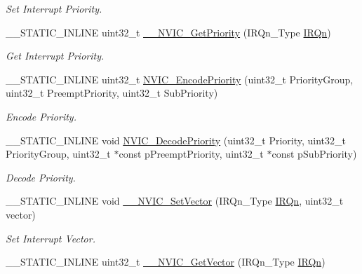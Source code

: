 \begin{DoxyCompactItemize}
\begin{DoxyCompactList}\small\item\em Set Interrupt Priority. \end{DoxyCompactList}\item 
\+\_\+\+\_\+\+S\+T\+A\+T\+I\+C\+\_\+\+I\+N\+L\+I\+NE uint32\+\_\+t \mbox{\hyperlink{group___c_m_s_i_s___core___n_v_i_c_functions_gaeb9dc99c8e7700668813144261b0bc73}{\+\_\+\+\_\+\+N\+V\+I\+C\+\_\+\+Get\+Priority}} (I\+R\+Qn\+\_\+\+Type \mbox{\hyperlink{group___interrupt__vector__numbers_ga666eb0caeb12ec0e281415592ae89083}{I\+R\+Qn}})
\begin{DoxyCompactList}\small\item\em Get Interrupt Priority. \end{DoxyCompactList}\item 
\+\_\+\+\_\+\+S\+T\+A\+T\+I\+C\+\_\+\+I\+N\+L\+I\+NE uint32\+\_\+t \mbox{\hyperlink{group___c_m_s_i_s___core___n_v_i_c_functions_gadb94ac5d892b376e4f3555ae0418ebac}{N\+V\+I\+C\+\_\+\+Encode\+Priority}} (uint32\+\_\+t Priority\+Group, uint32\+\_\+t Preempt\+Priority, uint32\+\_\+t Sub\+Priority)
\begin{DoxyCompactList}\small\item\em Encode Priority. \end{DoxyCompactList}\item 
\+\_\+\+\_\+\+S\+T\+A\+T\+I\+C\+\_\+\+I\+N\+L\+I\+NE void \mbox{\hyperlink{group___c_m_s_i_s___core___n_v_i_c_functions_ga3387607fd8a1a32cccd77d2ac672dd96}{N\+V\+I\+C\+\_\+\+Decode\+Priority}} (uint32\+\_\+t Priority, uint32\+\_\+t Priority\+Group, uint32\+\_\+t $\ast$const p\+Preempt\+Priority, uint32\+\_\+t $\ast$const p\+Sub\+Priority)
\begin{DoxyCompactList}\small\item\em Decode Priority. \end{DoxyCompactList}\item 
\+\_\+\+\_\+\+S\+T\+A\+T\+I\+C\+\_\+\+I\+N\+L\+I\+NE void \mbox{\hyperlink{group___c_m_s_i_s___core___n_v_i_c_functions_ga0df355460bc1783d58f9d72ee4884208}{\+\_\+\+\_\+\+N\+V\+I\+C\+\_\+\+Set\+Vector}} (I\+R\+Qn\+\_\+\+Type \mbox{\hyperlink{group___interrupt__vector__numbers_ga666eb0caeb12ec0e281415592ae89083}{I\+R\+Qn}}, uint32\+\_\+t vector)
\begin{DoxyCompactList}\small\item\em Set Interrupt Vector. \end{DoxyCompactList}\item 
\+\_\+\+\_\+\+S\+T\+A\+T\+I\+C\+\_\+\+I\+N\+L\+I\+NE uint32\+\_\+t \mbox{\hyperlink{group___c_m_s_i_s___core___n_v_i_c_functions_ga44b665d2afb708121d9b10c76ff00ee5}{\+\_\+\+\_\+\+N\+V\+I\+C\+\_\+\+Get\+Vector}} (I\+R\+Qn\+\_\+\+Type \mbox{\hyperlink{group___interrupt__vector__numbers_ga666eb0caeb12ec0e281415592ae89083}{I\+R\+Qn}})

\end{DoxyCompactItemize}
